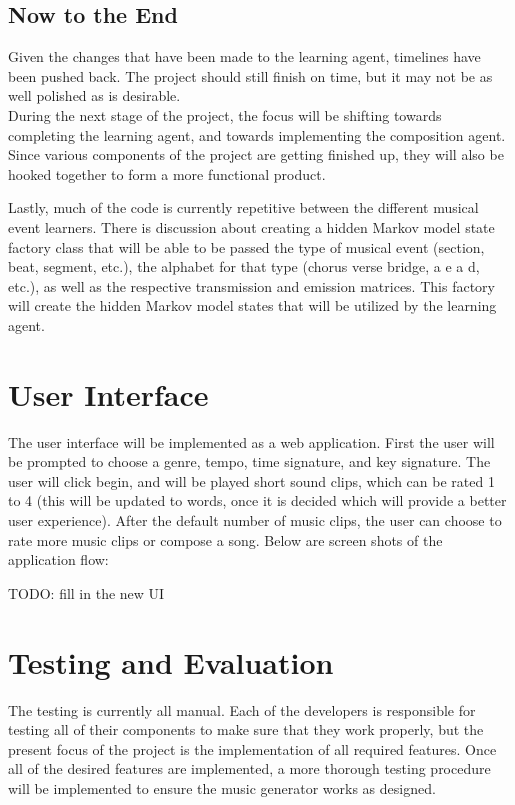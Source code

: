 \documentclass{article}
\begin{document}
\subsection{Now to the End}
Given the changes that have been made to the learning agent, timelines have been pushed back. The project should still finish on time, but it may not be as well polished as is desirable.
\\
During the next stage of the project, the focus will be shifting towards completing the learning agent, and towards implementing the composition agent. Since various components of the project are getting finished up, they will also be hooked together to form a more functional product.

Lastly, much of the code is currently repetitive between the different musical event learners. There is discussion about creating a hidden Markov model state factory class that will be able to be passed the type of musical event (section, beat, segment, etc.), the alphabet for that type (chorus verse bridge, a e a d, etc.), as well as the respective transmission and emission matrices. This factory will create the hidden Markov model states that will be utilized by the learning agent.

\section{User Interface}
The user interface will be implemented as a web application. First the user will be prompted to choose a genre, tempo, time signature, and key signature.  The user will click begin, and will be played short sound clips, which can be rated 1 to 4 (this will be updated to words, once it is decided which will provide a better user experience).  After the default number of music clips, the user can choose to rate more music clips or compose a song.  Below are screen shots of the application flow:

\Large{TODO: fill in the new UI} \normalsize

\section{Testing and Evaluation}
The testing is currently all manual. Each of the developers is responsible for testing all of their
components to make sure that they work properly, but the present focus of the project is the 
implementation of all required features. Once all of the desired features are implemented, a
more thorough testing procedure will be implemented to ensure the music generator works as designed.
\end{document}
